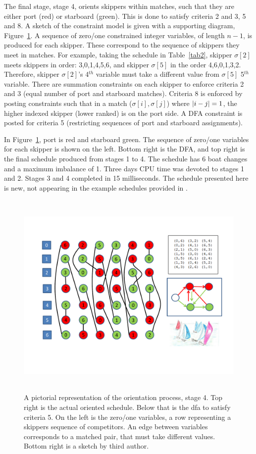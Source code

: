 \documentclass{llncs}
\DeclarePairedDelimiter\abs{\lvert}{\rvert}
\begin{document}
The final stage, stage 4, orients skippers within matches, such that they are
either port (red) or starboard (green). This is done to satisfy criteria 2 and
3, 5 and 8. A sketch of the constraint model is given with a supporting
diagram, Figure~\ref{oriented}.  A sequence of zero/one constrained integer
variables, of length $n-1$, is produced for each skipper. These correspond to
the sequence of skippers they meet in matches. For example, taking the schedule
in Table~\ref{tab2}, skipper $\sigma[{2}]$ meets skippers in order:
3,0,1,4,5,6, and skipper $\sigma[{5}]$ in the order 4,6,0,1,3,2.  Therefore,
skipper $\sigma[{2}]$'s 4$^{th}$ variable must take a different value from
$\sigma[{5}]$ 5$^{th}$ variable. There are summation constraints on each
skipper to enforce criteria 2 and 3 (equal number of port and starboard
matches). Criteria 8 is enforced by posting constraints such that in a match
($\sigma[{i}],\sigma[{j}]$) where $\abs*{i - j} = 1$, the higher indexed skipper
(lower ranked) is on the port side. A DFA constraint is posted for criteria 5
(restricting sequences of port and starboard assignments).

In Figure~\ref{oriented}, port is red and starboard green. The sequence of
zero/one variables for each skipper is shown on the left. Bottom right is the
DFA, and top right is the final schedule produced from stages 1 to 4. The
schedule has 6 boat changes and a maximum imbalance of 1. Three days CPU time
was devoted to stages 1 and 2. Stages 3 and 4 completed in 15 milliseconds. The
schedule presented here is new, not appearing in the example schedules provided in \cite{isaf}.%

\begin{figure}[tb]
\centering
\includegraphics[height=10.2cm,width=13.2cm]{oriented.pdf}
\caption{A pictorial representation of the orientation process, stage 4. Top
right is the actual oriented schedule. Below that is the dfa to satisfy
criteria 5. On the left is the zero/one variables, a row representing a
skippers sequence of competitors. An edge between variables corresponds to a
matched pair, that must take different values. Bottom right is a sketch by third author.}
\label{oriented}
\end{figure}
\end{document}
